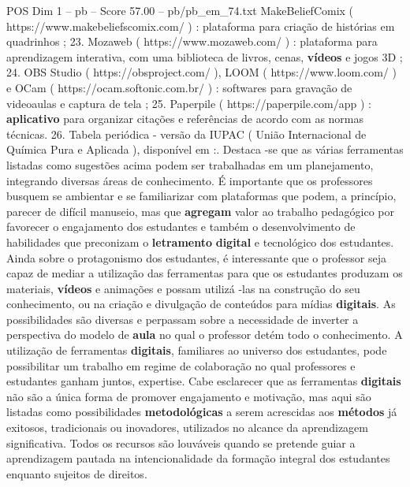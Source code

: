 \begin{textsample}{POS Dim 1 – pb – Score 57.00 – pb/pb\_em\_74.txt}
MakeBeliefComix ( https://www.makebeliefscomix.com/ ) : plataforma para criação de histórias em quadrinhos ; 23.
Mozaweb ( https://www.mozaweb.com/ ) : plataforma para aprendizagem interativa, com uma biblioteca de livros, cenas, \textbf{vídeos} e jogos 3D ; 24.
OBS Studio ( https://obsproject.com/ ), LOOM ( https://www.loom.com/ ) e OCam ( https://ocam.softonic.com.br/ ) : softwares para gravação de videoaulas e captura de tela ; 25.
Paperpile ( https://paperpile.com/app ) : \textbf{aplicativo} para organizar citações e referências de acordo com as normas técnicas. 26.
Tabela periódica - versão da IUPAC ( União Internacional de Química Pura e Aplicada ), disponível em :.
Destaca -se que as várias ferramentas listadas como sugestões acima podem ser trabalhadas em um planejamento, integrando diversas áreas de conhecimento.
É importante que os professores busquem se ambientar e se familiarizar com plataformas que podem, a princípio, parecer de difícil manuseio, mas que \textbf{agregam} valor ao trabalho pedagógico por favorecer o engajamento dos estudantes e também o desenvolvimento de habilidades que preconizam o \textbf{letramento} \textbf{digital} e tecnológico dos estudantes.
Ainda sobre o protagonismo dos estudantes, é interessante que o professor seja capaz de mediar a utilização das ferramentas para que os estudantes produzam os materiais, \textbf{vídeos} e animações e possam utilizá -las na construção do seu conhecimento, ou na criação e divulgação de conteúdos para mídias \textbf{digitais}.
As possibilidades são diversas e perpassam sobre a necessidade de inverter a perspectiva do modelo de \textbf{aula} no qual o professor detém todo o conhecimento.
A utilização de ferramentas \textbf{digitais}, familiares ao universo dos estudantes, pode possibilitar um trabalho em regime de colaboração no qual professores e estudantes ganham juntos, expertise.
Cabe esclarecer que as ferramentas \textbf{digitais} não são a única forma de promover engajamento e motivação, mas aqui são listadas como possibilidades \textbf{metodológicas} a serem acrescidas aos \textbf{métodos} já exitosos, tradicionais ou inovadores, utilizados no alcance da aprendizagem significativa.
Todos os recursos são louváveis quando se pretende guiar a aprendizagem pautada na intencionalidade da formação integral dos estudantes enquanto sujeitos de direitos.

\end{textsample}
